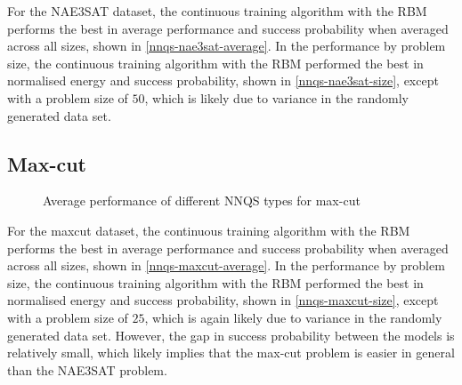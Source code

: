 For the NAE3SAT dataset, the continuous training algorithm with the RBM performs the best in average performance and success probability when averaged across all sizes, shown in \autoref{nnqs-nae3sat-average}. In the performance by problem size, the continuous training algorithm with the RBM performed the best in normalised energy and success probability, shown in \autoref{nnqs-nae3sat-size}, except with a problem size of $50$, which is likely due to variance in the randomly generated data set. 

\subsection{Max-cut}

\begin{figure}[!htbp]
    \centering
    \hfill
    \caption{Average performance of different NNQS types for max-cut}
    \label{nnqs-maxcut-average}
\end{figure}

For the maxcut dataset, the continuous training algorithm with the RBM performs the best in average performance and success probability when averaged across all sizes, shown in \autoref{nnqs-maxcut-average}. In the performance by problem size, the continuous training algorithm with the RBM performed the best in normalised energy and success probability, shown in \autoref{nnqs-maxcut-size}, except with a problem size of $25$, which is again likely due to variance in the randomly generated data set. However, the gap in success probability between the models is relatively small, which likely implies that the max-cut problem is easier in general than the NAE3SAT problem.


